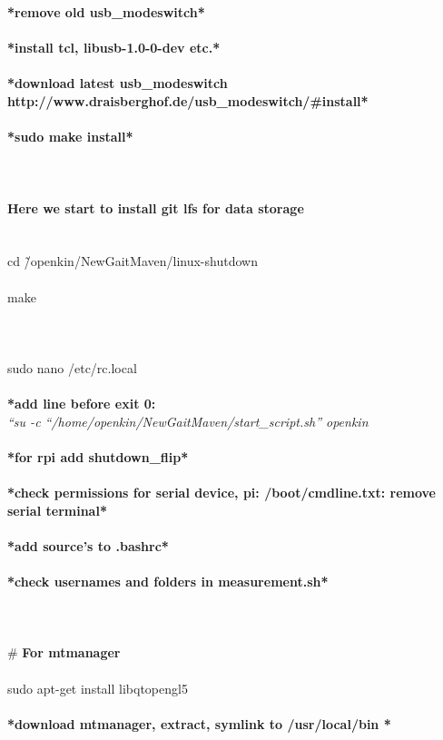 \documentclass{report}
\begin{document}
\textbf{*remove old usb\_modeswitch*}\\
\\
\textbf{*install tcl, libusb-1.0-0-dev etc.*}\\
\\
\textbf{*download latest usb\_modeswitch http://www.draisberghof.de/usb\_modeswitch/\#install*}\\
\\
\textbf{*sudo make install*}\\
\\
\\
\\
\textbf{Here we start to install git lfs for data storage}
\\
\\
\\
cd \~/openkin/NewGaitMaven/linux-shutdown\\
\\
make\\
\\
\\
\\
sudo nano /etc/rc.local\\
\\
\textbf{*add line before exit 0:}\\
\textit{“su -c “/home/openkin/NewGaitMaven/start\_script.sh” openkin}\\
\\
\textbf{*for rpi add shutdown\_flip*}\\
\\
\textbf{*check permissions for serial device, pi: /boot/cmdline.txt: remove serial terminal*}\\
\\
\textbf{*add source’s to .bashrc*}\\
\\
\textbf{*check usernames and folders in measurement.sh*}\\
\\
\\
\\
\# \textbf{For mtmanager}\\
\\
sudo apt-get install libqtopengl5 \\
\\
\textbf{*download mtmanager, extract, symlink to /usr/local/bin *}\\
\\
\end{document}
